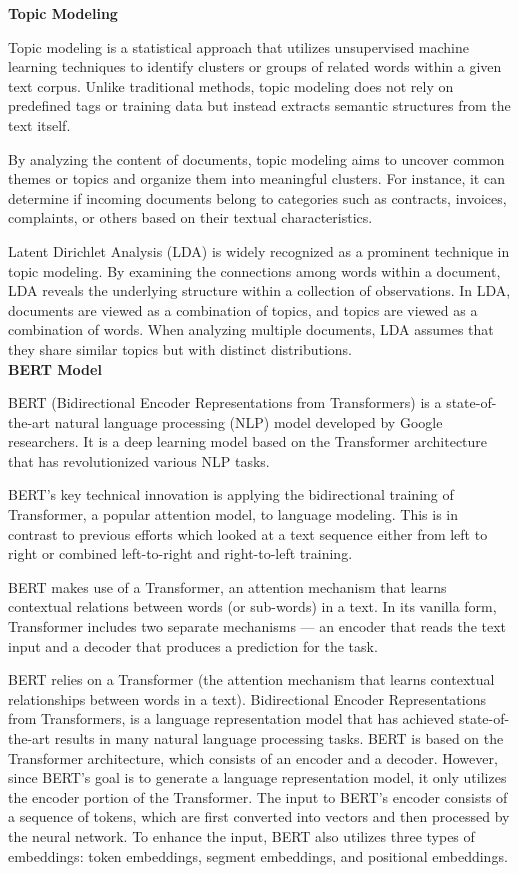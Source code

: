 \documentclass[conference]{IEEEtran}
\begin{document}
\textbf{Topic Modeling}

Topic modeling is a statistical approach that utilizes unsupervised machine learning techniques to identify clusters or groups of related words within a given text corpus. Unlike traditional methods, topic modeling does not rely on predefined tags or training data but instead extracts semantic structures from the text itself.

By analyzing the content of documents, topic modeling aims to uncover common themes or topics and organize them into meaningful clusters. For instance, it can determine if incoming documents belong to categories such as contracts, invoices, complaints, or others based on their textual characteristics.

Latent Dirichlet Analysis (LDA) is widely recognized as a prominent technique in topic modeling. By examining the connections among words within a document, LDA reveals the underlying structure within a collection of observations. In LDA, documents are viewed as a combination of topics, and topics are viewed as a combination of words. When analyzing multiple documents, LDA assumes that they share similar topics but with distinct distributions.\\


\textbf{BERT Model}

BERT (Bidirectional Encoder Representations from Transformers) is a state-of-the-art natural language processing (NLP) model developed by Google researchers. It is a deep learning model based on the Transformer architecture that has revolutionized various NLP tasks.  

BERT’s key technical innovation is applying the bidirectional training of Transformer, a popular attention model, to language modeling. This is in contrast to previous efforts which looked at a text sequence either from left to right or combined left-to-right and right-to-left training. 

BERT makes use of a Transformer, an attention mechanism that learns contextual relations between words (or sub-words) in a text. In its vanilla form, Transformer includes two separate mechanisms — an encoder that reads the text input and a decoder that produces a prediction for the task. 

BERT relies on a Transformer (the attention mechanism that learns contextual relationships between words in a text). Bidirectional Encoder Representations from Transformers, is a language representation model that has achieved state-of-the-art results in many natural language processing tasks. BERT is based on the Transformer architecture, which consists of an encoder and a decoder. However, since BERT's goal is to generate a language representation model, it only utilizes the encoder portion of the Transformer. The input to BERT's encoder consists of a sequence of tokens, which are first converted into vectors and then processed by the neural network. To enhance the input, BERT also utilizes three types of embeddings: token embeddings, segment embeddings, and positional embeddings.
\end{document}
